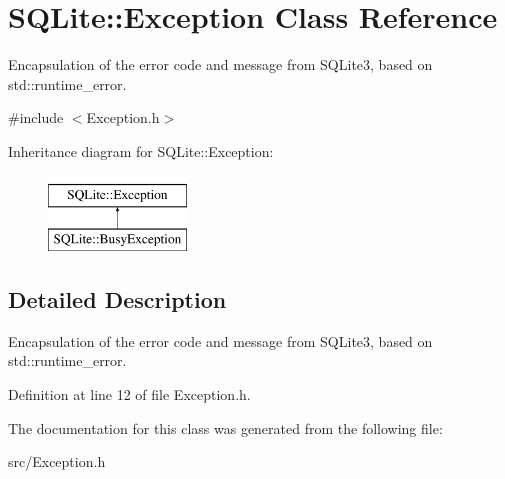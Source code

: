 \hypertarget{a00003}{\section{S\-Q\-Lite\-:\-:Exception Class Reference}
\label{a00003}
}


Encapsulation of the error code and message from S\-Q\-Lite3, based on std\-::runtime\-\_\-error.  




{\ttfamily \#include $<$Exception.\-h$>$}

Inheritance diagram for S\-Q\-Lite\-:\-:Exception\-:\begin{figure}[H]
\begin{center}
\leavevmode
\includegraphics[height=2.000000cm]{a00003}
\end{center}
\end{figure}


\subsection{Detailed Description}
Encapsulation of the error code and message from S\-Q\-Lite3, based on std\-::runtime\-\_\-error. 



Definition at line 12 of file Exception.\-h.



The documentation for this class was generated from the following file\-:\begin{DoxyCompactItemize}
\item 
src/Exception.\-h\end{DoxyCompactItemize}
